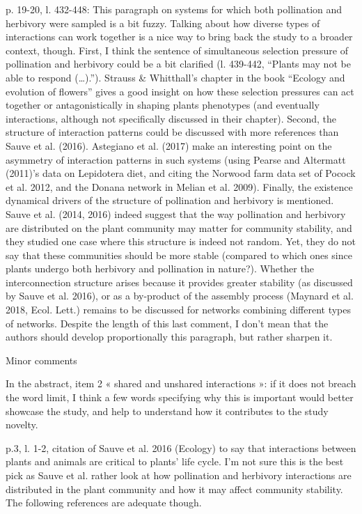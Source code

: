 \documentclass[12pt]{letter}
\begin{document}
p. 19-20, l. 432-448: This paragraph on systems for which both pollination and herbivory were sampled is a bit fuzzy. Talking about how diverse types of interactions can work together is a nice way to bring back the study to a broader context, though.
First, I think the sentence of simultaneous selection pressure of pollination and herbivory could be a bit clarified (l. 439-442, “Plants may not be able to respond (…).”). Strauss & Whitthall’s chapter in the book “Ecology and evolution of flowers” gives a good insight on how these selection pressures can act together or antagonistically in shaping plants phenotypes (and eventually interactions, although not specifically discussed in their chapter).
Second, the structure of interaction patterns could be discussed with more references than Sauve et al. (2016). Astegiano et al. (2017) make an interesting point on the asymmetry of interaction patterns in such systems (using Pearse and Altermatt (2011)’s data on Lepidotera diet, and citing the Norwood farm data set of Pocock et al. 2012, and the Donana network in Melian et al. 2009).
Finally, the existence dynamical drivers of the structure of pollination and herbivory is mentioned. Sauve et al. (2014, 2016) indeed suggest that the way pollination and herbivory are distributed on the plant community may matter for community stability, and they studied one case where this structure is indeed not random. Yet, they do not say that these communities should be more stable (compared to which ones since plants undergo both herbivory and pollination in nature?). Whether the interconnection structure arises because it provides greater stability (as discussed by Sauve et al. 2016), or as a by-product of the assembly process (Maynard et al. 2018, Ecol. Lett.) remains to be discussed for networks combining different types of networks.
Despite the length of this last comment, I don’t mean that the authors should develop proportionally this paragraph, but rather sharpen it.

Minor comments

In the abstract, item 2 « shared and unshared interactions »: if it does not breach the word limit, I think a few words specifying why this is important would better showcase the study, and help to understand how it contributes to the study novelty.

p.3, l. 1-2, citation of Sauve et al. 2016 (Ecology) to say that interactions between plants and animals are critical to plants’ life cycle. I’m not sure this is the best pick as Sauve et al. rather look at how pollination and herbivory interactions are distributed in the plant community and how it may affect community stability. The following references are adequate though.
\end{document}
